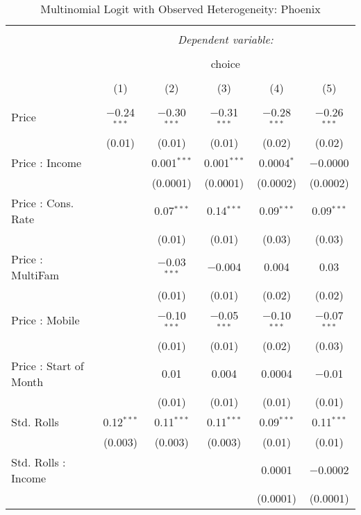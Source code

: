 
\begin{table}[!htbp] \centering 
  \caption{Multinomial Logit with Observed Heterogeneity: Phoenix} 
  \label{tab:mnlPhoenixObsHet} 
\begin{tabular}{@{\extracolsep{5pt}}lccccc} 
\\[-1.8ex]\hline 
\hline \\[-1.8ex] 
 & \multicolumn{5}{c}{\textit{Dependent variable:}} \\ 
\cline{2-6} 
\\[-1.8ex] & \multicolumn{5}{c}{choice} \\ 
\\[-1.8ex] & (1) & (2) & (3) & (4) & (5)\\ 
\hline \\[-1.8ex] 
 Price & $-$0.24$^{***}$ & $-$0.30$^{***}$ & $-$0.31$^{***}$ & $-$0.28$^{***}$ & $-$0.26$^{***}$ \\ 
  & (0.01) & (0.01) & (0.01) & (0.02) & (0.02) \\ 
  Price : Income &  & 0.001$^{***}$ & 0.001$^{***}$ & 0.0004$^{*}$ & $-$0.0000 \\ 
  &  & (0.0001) & (0.0001) & (0.0002) & (0.0002) \\ 
  Price : Cons. Rate &  & 0.07$^{***}$ & 0.14$^{***}$ & 0.09$^{***}$ & 0.09$^{***}$ \\ 
  &  & (0.01) & (0.01) & (0.03) & (0.03) \\ 
  Price : MultiFam &  & $-$0.03$^{***}$ & $-$0.004 & 0.004 & 0.03 \\ 
  &  & (0.01) & (0.01) & (0.02) & (0.02) \\ 
  Price : Mobile &  & $-$0.10$^{***}$ & $-$0.05$^{***}$ & $-$0.10$^{***}$ & $-$0.07$^{***}$ \\ 
  &  & (0.01) & (0.01) & (0.02) & (0.03) \\ 
  Price : Start of Month &  & 0.01 & 0.004 & 0.0004 & $-$0.01 \\ 
  &  & (0.01) & (0.01) & (0.01) & (0.01) \\ 
  Std. Rolls & 0.12$^{***}$ & 0.11$^{***}$ & 0.11$^{***}$ & 0.09$^{***}$ & 0.11$^{***}$ \\ 
  & (0.003) & (0.003) & (0.003) & (0.01) & (0.01) \\ 
  Std. Rolls : Income &  &  &  & 0.0001 & $-$0.0002 \\ 
  &  &  &  & (0.0001) & (0.0001) \\ 

\end{tabular}
\end{table}
